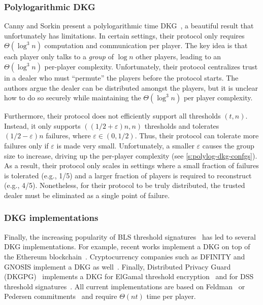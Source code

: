 \subsubsection{Polylogarithmic DKG}
Canny and Sorkin present a polylogarithmic time DKG~\cite{dkg-polylog}, a beautiful result that unfortunately has limitations.
In certain settings, their protocol only requires $\Theta(\log^3{n})$ computation and communication per player.
The key idea is that each player only talks to a \textit{group} of $\log{n}$ other players, leading to an $\Theta(\log^3{n})$ per-player complexity.
Unfortunately, their protocol centralizes trust in a dealer who must ``permute'' the players before the protocol starts.
The authors argue the dealer can be distributed amongst the players, but it is unclear how to do so securely while maintaining the $\Theta(\log^3{n})$ per player complexity.

Furthermore, their protocol does not efficiently support all thresholds $(t,n)$.
Instead, it only supports $((1/2 + \varepsilon)n, n)$ thresholds and tolerates $(1/2 - \varepsilon)n$ failures, where $\varepsilon \in (0,1/2)$.
Thus, their protocol can tolerate more failures only if $\varepsilon$ is made very small.
Unfortunately, a smaller $\varepsilon$ causes the group size to increase, driving up the per-player complexity (see \cref{s:polylog-dkg-confgs}).
As a result, their protocol only scales in settings where a small fraction of failures is tolerated (e.g., 1/5) and a larger fraction of players is required to reconstruct (e.g., 4/5).
Nonetheless, for their protocol to be truly distributed, the trusted dealer must be eliminated as a single point of failure.

\subsubsection{DKG implementations}
Finally, the increasing popularity of BLS threshold signatures~\cite{Boldyreva2003Threshold} has led to several DKG implementations.
For example, recent works implement a DKG on top of the Ethereum blockchain~\cite{SJSW19,Schindler2018EthDkgGithub,orbs-dkg-github}.
Cryptocurrency companies such as DFINITY and GNOSIS implement a DKG as well~\cite{dfinity-dkg,gnosis-dkg}.
Finally, Distributed Privacy Guard (DKGPG)~\cite{dkgpg} implements a DKG for ElGamal threshold encryption~\cite{DesmedtFrankel1990Threshold} and for DSS threshold signatures~\cite{Canetti1999Adaptive}.
All current implementations are based on Feldman~\cite{Feldman1987Practical} or Pedersen commitments~\cite{Pedersen1991AThreshold} and require $\Theta(nt)$ time per player.
